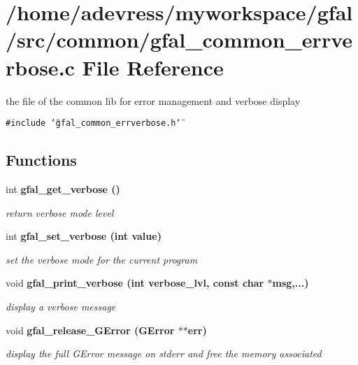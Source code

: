 \section{/home/adevress/myworkspace/gfal/src/common/gfal\_\-common\_\-errverbose.c File Reference}
\label{gfal__common__errverbose_8c}
the file of the common lib for error management and verbose display 

{\tt \#include \char`\"{}gfal\_\-common\_\-errverbose.h\char`\"{}}\par
\subsection*{Functions}
\begin{CompactItemize}
\item 
int \bf{gfal\_\-get\_\-verbose} ()\label{gfal__common__errverbose_8c_135b3fdd775aa7215e2ab4de1eea495f}

\begin{CompactList}\small\item\em return verbose mode level \item\end{CompactList}\item 
int \bf{gfal\_\-set\_\-verbose} (int value)
\begin{CompactList}\small\item\em set the verbose mode for the current program \item\end{CompactList}\item 
void \bf{gfal\_\-print\_\-verbose} (int verbose\_\-lvl, const char $\ast$msg,...)
\begin{CompactList}\small\item\em display a verbose message \item\end{CompactList}\item 
void \bf{gfal\_\-release\_\-GError} (GError $\ast$$\ast$err)\label{gfal__common__errverbose_8c_1441ea4b8176eb0cf3099009b950a3e9}

\begin{CompactList}\small\item\em display the full GError message on stderr and free the memory associated \item\end{CompactList}\end{CompactItemize}


